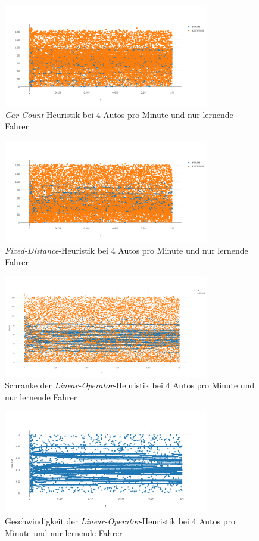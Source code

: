\begin{figure}[H]
	\includegraphics[width=0.8\textwidth]{analyse/JustHeuristik/4pm/car4just.png}
	\caption{\emph{Car-Count}-Heuristik bei 4 Autos pro Minute und nur lernende Fahrer}\label{fig:ap_jh_cc_4}
\end{figure}
\begin{figure}[H]
	\includegraphics[width=0.8\textwidth]{analyse/JustHeuristik/4pm/fixed4just.png}
	\caption{\emph{Fixed-Distance}-Heuristik bei 4 Autos pro Minute und nur lernende Fahrer}\label{fig:ap_jh_fd_4}
\end{figure}
\begin{figure}[H]
	\includegraphics[width=0.8\textwidth]{analyse/JustHeuristik/4pm/linop.png}
	\caption{Schranke der \emph{Linear-Operator}-Heuristik bei 4 Autos pro Minute und nur lernende Fahrer}\label{fig:ap_jh_loz_4}
\end{figure}
\begin{figure}[H]
	\includegraphics[width=0.8\textwidth]{analyse/JustHeuristik/4pm/linopa4just.png}
	\caption{Geschwindigkeit der \emph{Linear-Operator}-Heuristik bei 4 Autos pro Minute und nur lernende Fahrer}\label{fig:ap_jh_loa_4}
\end{figure}
